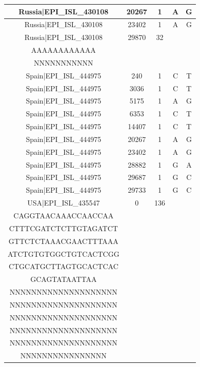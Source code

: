 \documentclass[a4paper,10pt]{article}
\begin{document}
\begin{longtable}{@{}ccccc@{}}
Russia|EPI\_ISL\_430108 & 20267 & 1 & A & G \\* \midrule
Russia|EPI\_ISL\_430108 & 23402 & 1 & A & G \\* \midrule
Russia|EPI\_ISL\_430108 & 29870 & 32 & \begin{tabular}[c]{@{}c@{}}AAAAAAAAAAAAAAAAAAAA\\ AAAAAAAAAAAA\end{tabular} & \begin{tabular}[c]{@{}c@{}}NNNNNNNNNNNNNNNNNNNNN\\ NNNNNNNNNNN\end{tabular} \\* \midrule
Spain|EPI\_ISL\_444975 & 240 & 1 & C & T \\* \midrule
Spain|EPI\_ISL\_444975 & 3036 & 1 & C & T \\* \midrule
Spain|EPI\_ISL\_444975 & 5175 & 1 & A & G \\* \midrule
Spain|EPI\_ISL\_444975 & 6353 & 1 & C & T \\* \midrule
Spain|EPI\_ISL\_444975 & 14407 & 1 & C & T \\* \midrule
Spain|EPI\_ISL\_444975 & 20267 & 1 & A & G \\* \midrule
Spain|EPI\_ISL\_444975 & 23402 & 1 & A & G \\* \midrule
Spain|EPI\_ISL\_444975 & 28882 & 1 & G & A \\* \midrule
Spain|EPI\_ISL\_444975 & 29687 & 1 & G & C \\* \midrule
Spain|EPI\_ISL\_444975 & 29733 & 1 & G & C \\* \midrule
USA|EPI\_ISL\_435547 & 0 & 136 & \begin{tabular}[c]{@{}c@{}}ATTAAAGGTTTATACCTTCC\\ CAGGTAACAAACCAACCAA\\ CTTTCGATCTCTTGTAGATCT\\ GTTCTCTAAACGAACTTTAAA\\ ATCTGTGTGGCTGTCACTCGG\\ CTGCATGCTTAGTGCACTCAC\\ GCAGTATAATTAA\end{tabular} & \begin{tabular}[c]{@{}c@{}}NNNNNNNNNNNNNNNNNNNN\\ NNNNNNNNNNNNNNNNNNNN\\ NNNNNNNNNNNNNNNNNNNN\\ NNNNNNNNNNNNNNNNNNNN\\ NNNNNNNNNNNNNNNNNNNN\\ NNNNNNNNNNNNNNNNNNNN\\ NNNNNNNNNNNNNNNN\end{tabular} \\* \midrule

\end{longtable}
\end{document}
